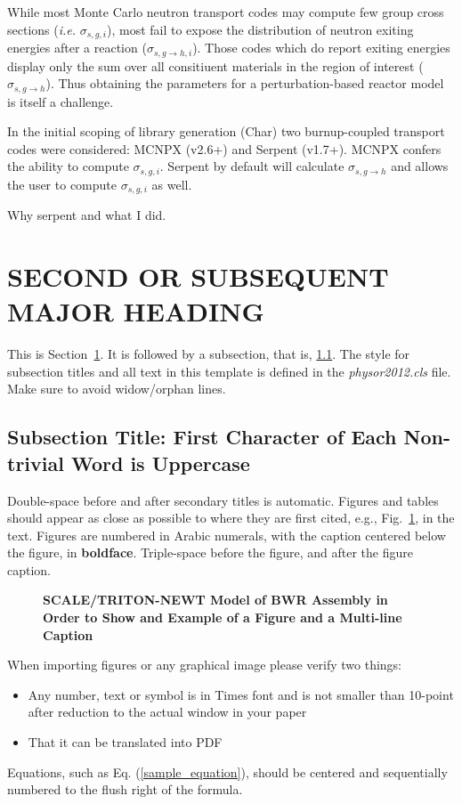 \documentclass{physor2012}
\begin{document}
While most Monte Carlo neutron transport codes may compute few group cross
sections (\emph{i.e.} $\sigma_{s,g,i}$), most fail to expose the distribution
of neutron exiting energies after a reaction ($\sigma_{s,g\to h,i}$).  Those
codes which do report exiting energies display only the sum over all consitiuent 
materials in the region of interest ($\sigma_{s,g\to h}$).  Thus obtaining 
the parameters for a perturbation-based reactor model is itself a challenge.

In the initial scoping of library generation (Char) two burnup-coupled transport 
codes were considered: MCNPX (v2.6+) and Serpent (v1.7+).  MCNPX confers the 
ability to compute $\sigma_{s,g,i}$.  Serpent by default will calculate 
$\sigma_{s,g\to h}$ and allows the user to compute $\sigma_{s,g,i}$ as well.

Why serpent and what I did.

\section{SECOND OR SUBSEQUENT MAJOR HEADING} 
\label{sec:first}
%
This is Section~\ref{sec:first}. It is followed by a subsection, that is, 
\ref{sec:second}. The style for subsection titles and all text in this template is defined in 
the \emph{physor2012.cls} file.  Make sure to avoid widow/orphan lines.
%
\subsection{Subsection Title: First Character of Each Non-trivial Word is Uppercase} 
\label{sec:second}
%
Double-space before and after secondary titles is automatic.  Figures and 
tables should appear as close as possible to where they are first
cited, e.g., Fig.~\ref{fig:amdahl}, in the text.  Figures are numbered in Arabic 
numerals, with the caption centered below the figure, in \textbf{boldface}.  
Triple-space before the figure, and after the figure caption.

\begin{figure}[!htb]
  \centering
  \caption{\bf SCALE/TRITON-NEWT Model of BWR Assembly in Order to Show and Example of a Figure and a Multi-line Caption} 
  \label{fig:amdahl}
\end{figure}

When importing figures or any graphical image please verify two things:
\begin{itemize}
\item Any number, text or symbol is in Times font and is not smaller than 
  10-point after reduction to the actual window in your paper
\item That it can be translated into PDF
\end{itemize}
Equations, such as Eq. (\ref{sample_equation}), should be centered and 
sequentially numbered to the flush right of the formula.
\end{document}
